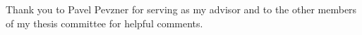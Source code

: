 \begin{frontmatter}
%
\tableofcontents
 \listoffigures  %
 \listoftables   %



%
%
\begin{acknowledgements} 
 Thank you to Pavel Pevzner for serving as my advisor and to the other members of my thesis committee for helpful comments.
\end{acknowledgements}



\end{frontmatter}
